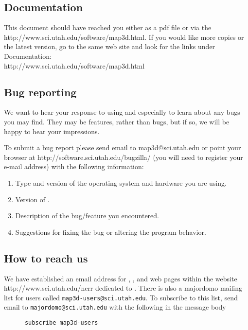 





\subsection{Documentation}

This document should have reached you either as a pdf file or via the
{http://www.sci.utah.edu/software/map3d.html}.  If you would like more
copies or the latest version, go to the
same web site and look for the links under Documentation:\\

{http://www.sci.utah.edu/software/map3d.html}

\subsection{Bug reporting}

We want to hear your response to using \map{} and especially to learn about
any bugs you may find.  They may be features, rather than bugs, but if so,
we will be happy to hear your impressions.

To submit a bug report please send email to map3d@sci.utah.edu or point your
browser at
{http://software.sci.utah.edu/bugzilla/} (you will need to register your e-mail
address) with the following information:

\begin{enumerate}
  \item Type and version of the operating system and hardware you are using.
  \item Version of \map{}.
  \item Description of the bug/feature you encountered.
  \item Suggestions for fixing the bug or altering the program behavior.
\end{enumerate}


\subsection{How to reach us}

We have established an email address for \map{},
, and
web pages within the website 
{http://www.sci.utah.edu/ncrr} dedicated to \map{}.  There is also a
majordomo mailing list for \map{} users called
\texttt{map3d-users@sci.utah.edu}.  To subscribe to this list, send email to
\texttt{majordomo@sci.utah.edu} with the following in the message body\\
%
\begin{verbatim}
      subscribe map3d-users
\end{verbatim}


